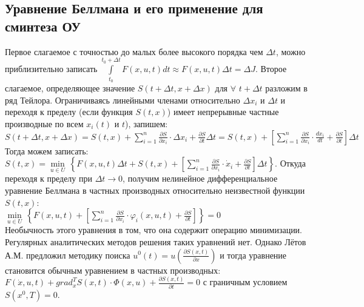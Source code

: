 \documentclass[preprint,russian,a5paper,10pt,twoside,mediummath]{ncc}
\begin{document}
\subsection{Уравнение Беллмана и его применение для сминтеза ОУ\label{synthesis:Bellman_equaration}}
\par Первое слагаемое с точностью до малых более высокого порядка чем $\Delta t$, можно приблизительно записать $\int\limits_{{{t}_{0}}}^{{{t}_{0}}+\Delta t}{F\left( x,u,t \right)}dt\approx F\left( x,u,t \right)\Delta t=\Delta J$. Второе слагаемое, определяющее значение $S\left( t+\Delta t,x+\Delta x \right)$ для $\forall $ $t+\Delta t$ разложим в ряд Тейлора. Ограничиваясь линейными членами относительно $\Delta {{x}_{i}}$ и $\Delta t$ и переходя к пределу (если функция $S\left( t,x \right)$) имеет непрерывные частные производные по всем ${{x}_{i}}\left( t \right)$ и $t$), запишем:
\\$S\left( t+\Delta t,x+\Delta x \right)=S\left( t,x \right)+\sum\limits_{i=1}^{n}{\frac{\partial S}{\partial {{x}_{i}}}}\cdot \Delta {{x}_{i}}+\frac{\partial S}{\partial t}\Delta t=S\left( t,x \right)+\left[ \sum\limits_{i=1}^{n}{\frac{\partial S}{\partial {{x}_{i}}}}\cdot \frac{d{{x}_{i}}}{dt}+\frac{\partial S}{\partial t} \right]\Delta t$
\\Тогда можем записать:
\\$S\left( t,x \right)=\underset{u\in U}{\mathop{\min }}\,\left\{ F\left( x,u,t \right)\Delta t+S\left( t,x \right)+\left[ \sum\limits_{i=1}^{n}{\frac{\partial S}{\partial {{x}_{i}}}\cdot {{{\dot{x}}}_{i}}+\frac{\partial S}{\partial t}} \right]\Delta t \right\}$. Откуда переходя к пределу при $\Delta t\to 0$, получим нелинейное дифференциальное уравнение Беллмана в частных производных относительно неизвестной функции $S\left( t,x \right)$:
\\$\underset{u\in U}{\mathop{\min }}\,\left\{ F\left( x,u,t \right)+\left[ \sum\limits_{i=1}^{n}{\frac{\partial S}{\partial {{x}_{i}}}\cdot {{\varphi }_{i}}\left( x,u,t \right)+\frac{\partial S}{\partial t}} \right] \right\}=0$ 
\\Необычность этого уравнения в том, что она содержит операцию минимизации. Регулярных аналитических методов решения таких уравнений нет. Однако Лётов А.М. предложил методику поиска ${{u}^{0}}\left( t \right)=u\left( \frac{\partial S\left( x,t \right)}{\partial x} \right)$ и тогда уравнение становится обычным уравнением в частных производных:
\\$F\left( \dot{x},u,t \right)+grad_{x}^{T}S\left( x,t \right)\cdot \Phi \left( x,u \right)+\frac{\partial S\left( x,t \right)}{\partial t}=0$ с граничным условием $S\left( {{x}^{0}},T \right)=0$.
\end{document}
